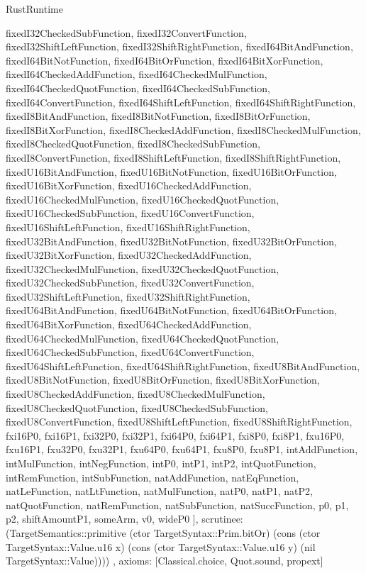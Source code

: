 \begin{lexlean}{RustRuntime}
\begin{semanticmodule}
{{      fixedI32CheckedSubFunction,
      fixedI32ConvertFunction,
      fixedI32ShiftLeftFunction,
      fixedI32ShiftRightFunction,
      fixedI64BitAndFunction,
      fixedI64BitNotFunction,
      fixedI64BitOrFunction,
      fixedI64BitXorFunction,
      fixedI64CheckedAddFunction,
      fixedI64CheckedMulFunction,
      fixedI64CheckedQuotFunction,
      fixedI64CheckedSubFunction,
      fixedI64ConvertFunction,
      fixedI64ShiftLeftFunction,
      fixedI64ShiftRightFunction,
      fixedI8BitAndFunction,
      fixedI8BitNotFunction,
      fixedI8BitOrFunction,
      fixedI8BitXorFunction,
      fixedI8CheckedAddFunction,
      fixedI8CheckedMulFunction,
      fixedI8CheckedQuotFunction,
      fixedI8CheckedSubFunction,
      fixedI8ConvertFunction,
      fixedI8ShiftLeftFunction,
      fixedI8ShiftRightFunction,
      fixedU16BitAndFunction,
      fixedU16BitNotFunction,
      fixedU16BitOrFunction,
      fixedU16BitXorFunction,
      fixedU16CheckedAddFunction,
      fixedU16CheckedMulFunction,
      fixedU16CheckedQuotFunction,
      fixedU16CheckedSubFunction,
      fixedU16ConvertFunction,
      fixedU16ShiftLeftFunction,
      fixedU16ShiftRightFunction,
      fixedU32BitAndFunction,
      fixedU32BitNotFunction,
      fixedU32BitOrFunction,
      fixedU32BitXorFunction,
      fixedU32CheckedAddFunction,
      fixedU32CheckedMulFunction,
      fixedU32CheckedQuotFunction,
      fixedU32CheckedSubFunction,
      fixedU32ConvertFunction,
      fixedU32ShiftLeftFunction,
      fixedU32ShiftRightFunction,
      fixedU64BitAndFunction,
      fixedU64BitNotFunction,
      fixedU64BitOrFunction,
      fixedU64BitXorFunction,
      fixedU64CheckedAddFunction,
      fixedU64CheckedMulFunction,
      fixedU64CheckedQuotFunction,
      fixedU64CheckedSubFunction,
      fixedU64ConvertFunction,
      fixedU64ShiftLeftFunction,
      fixedU64ShiftRightFunction,
      fixedU8BitAndFunction,
      fixedU8BitNotFunction,
      fixedU8BitOrFunction,
      fixedU8BitXorFunction,
      fixedU8CheckedAddFunction,
      fixedU8CheckedMulFunction,
      fixedU8CheckedQuotFunction,
      fixedU8CheckedSubFunction,
      fixedU8ConvertFunction,
      fixedU8ShiftLeftFunction,
      fixedU8ShiftRightFunction,
      fxi16P0,
      fxi16P1,
      fxi32P0,
      fxi32P1,
      fxi64P0,
      fxi64P1,
      fxi8P0,
      fxi8P1,
      fxu16P0,
      fxu16P1,
      fxu32P0,
      fxu32P1,
      fxu64P0,
      fxu64P1,
      fxu8P0,
      fxu8P1,
      intAddFunction,
      intMulFunction,
      intNegFunction,
      intP0,
      intP1,
      intP2,
      intQuotFunction,
      intRemFunction,
      intSubFunction,
      natAddFunction,
      natEqFunction,
      natLeFunction,
      natLtFunction,
      natMulFunction,
      natP0,
      natP1,
      natP2,
      natQuotFunction,
      natRemFunction,
      natSubFunction,
      natSuccFunction,
      p0,
      p1,
      p2,
      shiftAmountP1,
      someArm,
      v0,
      wideP0
    ],
    scrutinee: (TargetSemantics::primitive (ctor TargetSyntax::Prim.bitOr) (cons (ctor TargetSyntax::Value.u16 x) (cons (ctor TargetSyntax::Value.u16 y) (nil TargetSyntax::Value))))
  },
  axioms: [Classical.choice, Quot.sound, propext]
}


\end{semanticmodule}
\end{lexlean}
